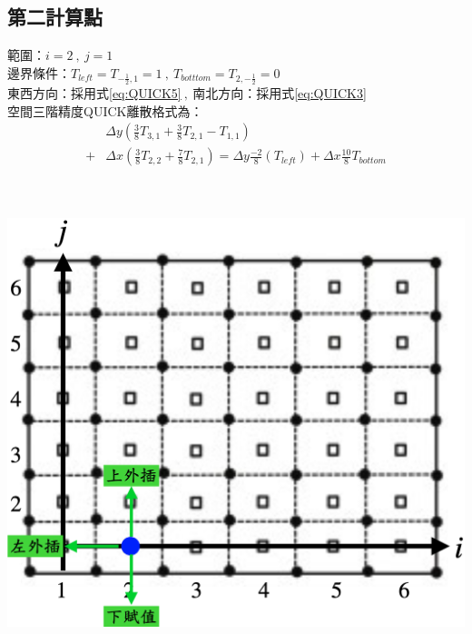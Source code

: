 \documentclass[12pt]{article}
\begin{document}
\subsection{第二計算點}
 \begin{minipage}{0.6\textwidth}
   \noindent 範圍：$i=2\ ,\ j=1$\\[1.5ex]
   \noindent 邊界條件：$T_{left} = T_{-\frac{1}{2},1}= 1\ ,\ T_{botttom} = T_{2,-\frac{1}{2}}= 0$\\[1.5ex]
   \noindent 東西方向：採用式\eqref{eq:QUICK5}$\ ,\ $南北方向：採用式\eqref{eq:QUICK3}\\[1.5ex]
   \noindent 空間三階精度QUICK離散格式為：
   \begin{equation*}\begin{split}
   &\Delta y(\frac{3}{8}T_{3,1} + \frac{3}{8}T_{2,1} -T_{1,1})\\[1.5ex] 
  +&\Delta x (\frac{3}{8}T_{2,2} + \frac{7}{8}T_{2,1} ) =\Delta y \frac{-2}{8}(T_{left})+\Delta x\frac{10}{8}T_{bottom} \\[1.5ex] 
   \end{split}\end{equation*}
   \end{minipage}                          
   \hfill
   \begin{minipage}{0.34\textwidth}
   \centering
   \includegraphics[width=\linewidth,height=9\baselineskip]{21.png}
   \label{fig:2nd point}
\end{minipage}
\end{document}
